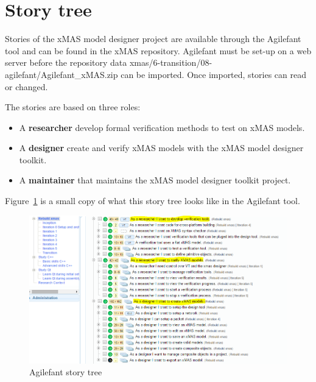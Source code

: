 \section{Story tree}

Stories of the xMAS model designer project are available through the Agilefant
tool and can be found in the xMAS repository. Agilefant must be set-up on a web
server before the repository data xmas/6-transition/08-agilefant/Agilefant\_xMAS.zip
can be imported. Once imported, stories can read or changed.

The stories are based on three roles:
\begin{itemize}
\item A \textbf{researcher} develop formal verification methods to test on xMAS models.
\item A \textbf{designer} create and verify xMAS models with the xMAS model designer toolkit. 
\item A \textbf{maintainer} that maintains the xMAS model designer toolkit project. 
\end{itemize}

Figure~\ref{fig:story-tree} is a small copy of what this story tree looks like in the Agilefant tool.


\begin{figure}[here]
\begin{center}	
	\includegraphics[width=.70\linewidth]{pictures/story-tree}
	\caption{Agilefant story tree}
	\label{fig:story-tree}
\end{center}
\end{figure}


